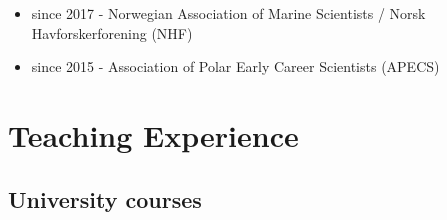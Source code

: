 \documentclass[11pt, a4paper]{awesome-cv}
\providecommand{\tightlist}{%
	\setlength{\itemsep}{0pt}\setlength{\parskip}{0pt}}
\begin{document}
\begin{itemize}
\tightlist
\item
  since 2017 - Norwegian Association of Marine Scientists / Norsk
  Havforskerforening (NHF)
\item
  since 2015 - Association of Polar Early Career Scientists (APECS)
\end{itemize}

\hypertarget{teaching-experience}{%
\section{Teaching Experience}\label{teaching-experience}}

\hypertarget{university-courses}{%
\subsection{University courses}\label{university-courses}}
\end{document}
